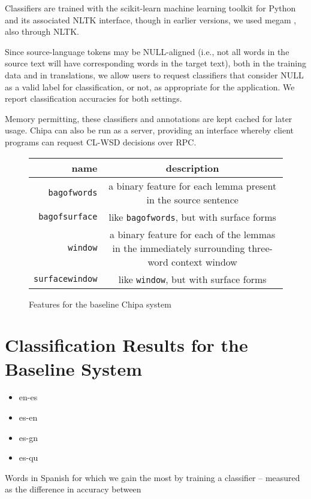 Classifiers are trained with the scikit-learn machine learning toolkit
\cite{scikit-learn} for Python and its associated NLTK interface, though in
earlier versions, we used megam \cite{daume04cg-bfgs}, also through NLTK.

Since source-language tokens may be NULL-aligned (i.e., not all words in the
source text will have corresponding words in the target text), both in the
training data and in translations, we allow users to request classifiers that
consider NULL as a valid label for classification, or not, as appropriate for
the application. We report classification accuracies for both settings.

Memory permitting, these classifiers and annotations are kept cached for later
usage. Chipa can also be run as a server, providing an interface whereby client
programs can request CL-WSD decisions over RPC.

\begin{figure*}
  \begin{centering}
  \begin{tabular}{|r|c|}
    \hline
    name          & description  \\
    \hline
    \texttt{bagofwords}    & a binary feature for each lemma present in the source sentence \\
    \texttt{bagofsurface}  & like \texttt{bagofwords}, but with surface forms \\
    \texttt{window}       & a binary feature for each of the lemmas in the immediately surrounding three-word context window \\
    \texttt{surfacewindow} & like \texttt{window}, but with surface forms \\
    \hline
  \end{tabular}
  \end{centering}
  \caption{Features for the baseline Chipa system}
  \label{fig:baselinefeatures}
\end{figure*}

\section{Classification Results for the Baseline System}

\begin{itemize}
\item en-es
\item es-en
\item es-gn
\item es-qu
\end{itemize}

Words in Spanish for which we gain the most by training a classifier --
measured as the difference in accuracy between
